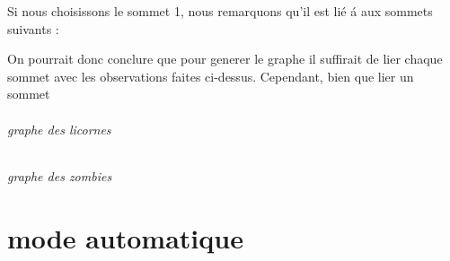 \documentclass{report}
\begin{document}
			\begin{center}
			\end{center}
			
			Si nous choisissons le sommet 1, nous remarquons qu'il est li\'e \'a aux sommets suivants :
			
			
			On pourrait donc conclure que pour generer le graphe il suffirait de lier chaque sommet avec les observations faites ci-dessus. Cependant, bien que lier un sommet
			
			
			
			
			
			
			\paragraph{graphe des licornes}
			\paragraph{graphe des zombies}
	\part{mode automatique}
	
\end{document}
